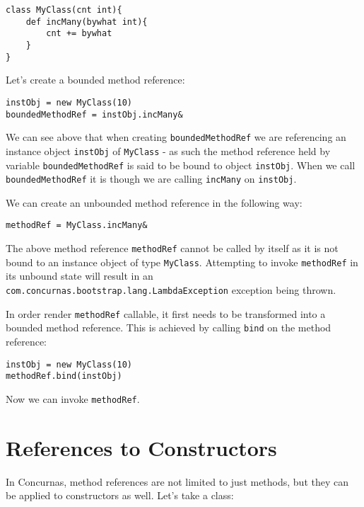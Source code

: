 \documentclass[conc-doc]{subfiles}
\begin{document}
\begin{lstlisting}
class MyClass(cnt int){
	def incMany(bywhat int){
		cnt += bywhat
	}
}
\end{lstlisting}

Let's create a bounded method reference:

\begin{lstlisting}
instObj = new MyClass(10)
boundedMethodRef = instObj.incMany&
\end{lstlisting}

\begin{sloppypar}
We can see above that when creating \lstinline{boundedMethodRef} we are referencing an instance object \lstinline{instObj} of \lstinline{MyClass} - as such the method reference held by variable \lstinline{boundedMethodRef} is said to be bound to object \lstinline{instObj}. When we call \lstinline{boundedMethodRef} it is though we are calling \lstinline{incMany} on \lstinline{instObj}.
\end{sloppypar}
	
We can create an unbounded method reference in the following way:

\begin{lstlisting}
methodRef = MyClass.incMany&
\end{lstlisting}

The above method reference \lstinline{methodRef} cannot be called by itself as it is not bound to an instance object of type \lstinline{MyClass}. Attempting to invoke \lstinline{methodRef} in its unbound state will result in an \lstinline{com.concurnas.bootstrap.lang.LambdaException} exception being thrown.

In order render \lstinline{methodRef} callable, it first needs to be transformed into a bounded method reference. This is achieved by calling \lstinline{bind} on the method reference:

\begin{lstlisting}
instObj = new MyClass(10)
methodRef.bind(instObj)
\end{lstlisting}

Now we can invoke \lstinline{methodRef}.

\section{References to Constructors}
In Concurnas, method references are not limited to just methods, but they can be applied to constructors as well. Let's take a class:
\end{document}

